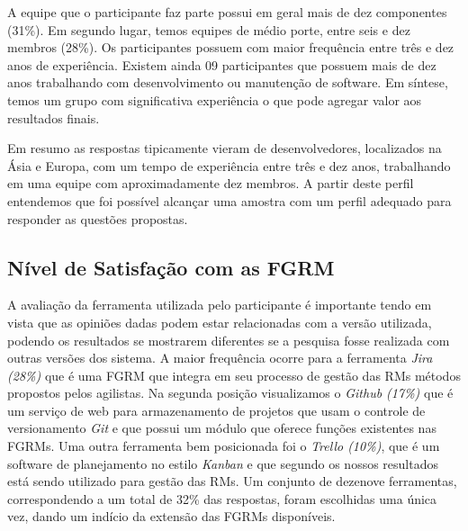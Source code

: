 A equipe que o participante faz parte possui em geral mais de dez componentes
(31\%). Em segundo lugar, temos equipes de médio porte, entre seis e dez membros
(28\%). Os participantes possuem com maior frequência entre três e dez anos de
experiência. Existem ainda 09 participantes que possuem mais de dez anos
trabalhando com desenvolvimento ou manutenção de software. Em síntese, temos um
grupo com significativa experiência o que pode agregar valor aos resultados
finais.



Em resumo as respostas tipicamente vieram de desenvolvedores, localizados na
Ásia e Europa, com um tempo de experiência entre três e dez anos, trabalhando em
uma equipe com aproximadamente dez membros. A partir deste perfil entendemos que
foi possível alcançar uma amostra com um perfil adequado para responder as
questões propostas.

\subsection{Nível de Satisfação com as FGRM}
\label{sub:nivel_de_satisfação_com_as_fgrm}

A avaliação da ferramenta utilizada pelo participante é importante tendo em
vista que as opiniões dadas podem estar relacionadas com a versão utilizada,
podendo os resultados se mostrarem diferentes se a pesquisa fosse realizada com
outras versões dos sistema. A maior frequência ocorre para a ferramenta
\textit{Jira (28\%)} que é uma FGRM que integra em seu processo de gestão das
RMs métodos propostos pelos agilistas. Na segunda posição visualizamos o
\textit{Github (17\%)} que é um serviço de web para armazenamento de projetos
que usam o controle de versionamento \textit{Git} e que possui um módulo que
oferece funções existentes nas FGRMs. Uma outra ferramenta bem posicionada foi o
\textit{Trello (10\%)}, que é um software de planejamento no estilo
\textit{Kanban} e que segundo os nossos resultados está sendo utilizado para
gestão das RMs. Um conjunto de dezenove ferramentas, correspondendo a um total
de 32\% das respostas, foram escolhidas uma única vez, dando um indício da
extensão das FGRMs disponíveis.

